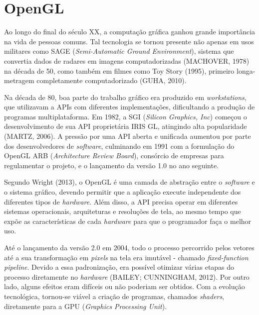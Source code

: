 \chapter{OpenGL}
Ao longo do final do século XX, a computação gráfica ganhou grande importância na vida de pessoas comuns. Tal tecnologia se tornou presente não apenas em usos militares como SAGE (\textit{Semi-Automatic Ground Environment}), sistema que convertia dados de radares em imagens computadorizadas (MACHOVER, 1978) na década de 50, como também em filmes como Toy Story (1995), primeiro longa-metragem completamente computadorizado (GUHA, 2010).


Na década de 80, boa parte do trabalho gráfico era produzido em \textit{workstations}, que utilizavam a APIs com diferentes implementações, dificultando a produção de programas multiplataforma. Em 1982, a SGI (\textit{Silicon Graphics, Inc}) começou o desenvolvimento de sua API proprietária IRIS GL, atingindo alta popularidade (MARTZ, 2006). A pressão por uma API aberta e unificada aumentou por parte dos desenvolvedores de \textit{software}, culminando em 1991 com a formulação do OpenGL ARB (\textit{Architecture Review Board}), consórcio de empresas para regulamentar o projeto, e o lançamento da versão 1.0 no ano seguinte.

Segundo Wright (2013), o OpenGL é uma camada de abstração entre o \textit{software} e o sistema gráfico, devendo permitir que a aplicação execute independente dos diferentes tipos de \textit{hardware}. Além disso, a API precisa operar em diferentes sistemas operacionais, arquiteturas e resoluções de tela, ao mesmo tempo que expõe as características de cada \textit{hardware} para que o programador faça o melhor uso.

Até o lançamento da versão 2.0 em 2004, todo o processo percorrido pelos vetores até a sua transformação em \textit{pixels} na tela era imutável - chamado \textit{fixed-function pipeline}. Devido a essa padronização, era possível otimizar várias etapas do processo diretamente no \textit{hardware} (BAILEY; CUNNINGHAM, 2012). Por outro lado, alguns efeitos eram difíceis ou não poderiam ser obtidos. Com a evolução tecnológica, tornou-se viável a criação de programas, chamados \textit{shaders}, diretamente para a GPU (\textit{Graphics Processing Unit}).

